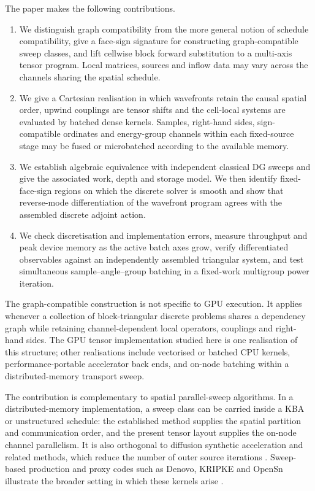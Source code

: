 \documentclass[final]{amsart}
\begin{document}
The paper makes the following contributions.

\begin{enumerate}
\item We distinguish graph compatibility from the more general notion
of schedule compatibility, give a face-sign signature for constructing
graph-compatible sweep classes, and lift cellwise block forward
substitution to a multi-axis tensor program. Local matrices, sources
and inflow data may vary across the channels sharing the spatial
schedule.

\item We give a Cartesian realisation in which wavefronts retain the
causal spatial order, upwind couplings are tensor shifts and the
cell-local systems are evaluated by batched dense kernels. Samples,
right-hand sides, sign-compatible ordinates and energy-group channels
within each fixed-source stage may be fused or microbatched according
to the available memory.

\item We establish algebraic equivalence with independent classical DG
sweeps and give the associated work, depth and storage model. We then
identify fixed-face-sign regions on which the discrete solver is smooth
and show that reverse-mode differentiation of the wavefront program
agrees with the assembled discrete adjoint action.

\item We check discretisation and implementation errors, measure
throughput and peak device memory as the active batch axes grow, verify
differentiated observables against an independently assembled triangular
system, and test simultaneous sample--angle--group batching in a
fixed-work multigroup power iteration.
\end{enumerate}

The graph-compatible construction is not specific to GPU execution.
It applies whenever a collection of block-triangular discrete problems
shares a dependency graph while retaining channel-dependent local
operators, couplings and right-hand sides. The GPU tensor
implementation studied here is one realisation of this structure;
other realisations include vectorised or batched CPU kernels,
performance-portable accelerator back ends, and on-node batching
within a distributed-memory transport sweep.

The contribution is complementary to spatial parallel-sweep algorithms.
In a distributed-memory implementation, a sweep class can be carried
inside a KBA or unstructured schedule: the established method supplies
the spatial partition and communication order, and the present tensor
layout supplies the on-node channel parallelism. It is also orthogonal
to diffusion synthetic acceleration and related methods, which reduce
the number of outer source iterations
\cite{Larsen1984DSA,AdamsMartin1992DSA}. Sweep-based production and
proxy codes such as Denovo, KRIPKE and OpenSn illustrate the broader
setting in which these kernels arise
\cite{EvansEtAl2010Denovo,KunenBaileyBrown2015Kripke,
AndrsEtAl2026OpenSn}.
\end{document}
